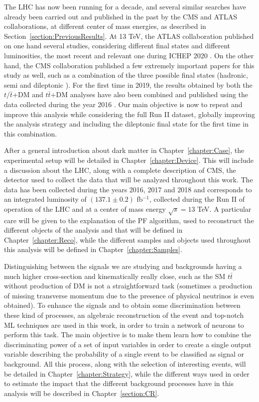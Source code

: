 \documentclass[a4paper, 10pt, openright]{report}
\begin{document}
The \ac{LHC} has now been running for a decade, and several similar searches have already been carried out and published in the past by the \ac{CMS} and \ac{ATLAS} collaborations, at different center of mass energies, as described in Section~\ref{section:PreviousResults}. At 13 TeV, the \ac{ATLAS} collaboration published on one hand several studies, considering different final states and different luminosities, the most recent and relevant one during ICHEP 2020 \cite{ATLASICHEP2020}. On the other hand, the \ac{CMS} collaboration published a few extremely important papers for this study as well, such as a combination of the three possible final states (hadronic, semi and dileptonic \cite{PreviousDoubleTopAllLep13CMS}). For the first time in 2019, the results obtained by both the $t/\bar t$+DM and $t \bar t$+DM analyses have also been combined and published using the data collected during the year 2016 \cite{PreviousSingleDoubleTopAllLep13CMS}. Our main objective is now to repeat and improve this analysis while considering the full Run II dataset, globally improving the analysis strategy and including the dileptonic final state for the first time in this combination.

After a general introduction about dark matter in Chapter~\ref{chapter:Case}, the experimental setup will be detailed in Chapter~\ref{chapter:Device}. This will include a discussion about the \ac{LHC}, along with a complete description of \ac{CMS}, the detector used to collect the data that will be analyzed throughout this work. The data has been collected during the years 2016, 2017 and 2018 and corresponds to an integrated luminosity of $(137.1 \pm 0.2)$ fb$^{-1}$, collected during the Run II of operation of the \ac{LHC} and at a center of mass energy $\sqrt{s} = 13$ TeV. A particular care will be given to the explanation of the \acf{PF} algorithm, used to reconstruct the different objects of the analysis and that will be defined in Chapter~\ref{chapter:Reco}, while the different samples and objects used throughout this analysis will be defined in Chapter~\ref{chapter:Samples}.

Distinguishing between the signals we are studying and backgrounds having a much higher cross-section and kinematically really close, such as the \ac{SM} $t \bar t$ without production of \ac{DM} is not a straightforward task (sometimes a production of missing transverse momentum due to the presence of physical neutrinos is even obtained). To enhance the signals and to obtain some discrimination between these kind of processes, an algebraic reconstruction of the event and top-notch \ac{ML} techniques are used in this work, in order to train a network of neurons to perform this task. The main objective is to make them learn how to combine the discriminating power of a set of input variables in order to create a single output variable describing the probability of a single event to be classified as signal or background. All this process, along with the selection of interesting events, will be detailed in Chapter~\ref{chapter:Strategy}, while the different ways used in order to estimate the impact that the different background processes have in this analysis will be described in Chapter~\ref{section:CR}.
\end{document}

